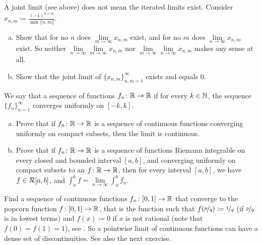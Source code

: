 \begin{exercise}
A joint limit (see above) does not mean the iterated limits exist.
Consider $x_{n,m} \coloneqq \frac{{(-1)}^{n+m}}{\min \{n,m \}}$.
\begin{enumerate}[a)]
\item
Show that for no $n$ does
$\lim\limits_{m \to \infty} x_{n,m}$ exist, and for no $m$
does 
$\lim\limits_{n \to \infty} x_{n,m}$ exist.  So neither
$\lim\limits_{n\to\infty}\lim\limits_{m \to \infty} x_{n,m}$ nor
$\lim\limits_{m\to\infty}\lim\limits_{n \to \infty} x_{n,m}$ makes any sense
at all.
\item
Show that the joint limit of $\{ x_{n,m} \}_{n,m=1}^\infty$ exists and equals 0.
\end{enumerate}
\end{exercise}

\begin{exercise}
We say that a sequence of functions $f_n \colon {\mathbb{R}} \to {\mathbb{R}}$
\emph{}
if for every $k \in {\mathbb{N}}$,
the sequence $\{ f_n \}_{n=1}^\infty$ converges uniformly on $[-k,k]$.
\begin{enumerate}[a)]
\item
Prove that if $f_n \colon {\mathbb{R}} \to {\mathbb{R}}$ is a sequence of
continuous functions converging uniformly on compact subsets, then
the limit is continuous.
\item 
Prove that if $f_n \colon {\mathbb{R}} \to {\mathbb{R}}$ is a sequence of
functions Riemann integrable on every closed and bounded interval $[a,b]$,
and converging uniformly on compact subsets to an $f \colon {\mathbb{R}} \to {\mathbb{R}}$,
then for every interval $[a,b]$, we have $f \in {\mathcal{R}}[a,b]$, and
$\int_a^b f = \lim\limits_{n\to\infty} \int_a^b f_n$.
\end{enumerate}
\end{exercise}

\begin{exercise}[Challenging]
Find a sequence of continuous functions $f_n \colon [0,1] \to {\mathbb{R}}$ that
converge to the popcorn function $f \colon [0,1] \to {\mathbb{R}}$, that is the
function such that $f(\nicefrac{p}{q}) \coloneqq \nicefrac{1}{q}$ (if $\nicefrac{p}{q}$
is in lowest terms) and $f(x) \coloneqq 0$ if $x$ is not rational (note
that $f(0) = f(1) = 1$),
see .
So a pointwise limit of continuous functions can have a dense set of
discontinuities.  See also the next exercise.
\end{exercise}

